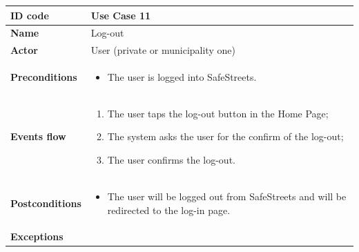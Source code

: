 \documentclass[titlepage]{article}
\begin{document}
\begin{longtable}{| p{3 cm} | p{10 cm} |} 
\hline


\textbf{ID code} & Use Case 11 \\ \hline
\textbf{Name} & Log-out \\ \hline
\textbf{Actor} & User (private or municipality one) \\ \hline
\textbf{Preconditions} & 
\begin{itemize}
\item The user is logged into SafeStreets.
\end{itemize}  \\ \hline

\textbf{Events flow} & 
\begin{enumerate}
\item The user taps the log-out button in the Home Page;
\item The system asks the user for the confirm of the log-out;
\item The user confirms the log-out.
\end{enumerate} \\ \hline

\textbf{Postconditions} & 
\begin{itemize}
\item The user will be logged out from SafeStreets and will be redirected to the log-in page.
\end{itemize} \\ \hline

\textbf{Exceptions} & \\ \hline



\end{longtable}

\newpage
\end{document}
